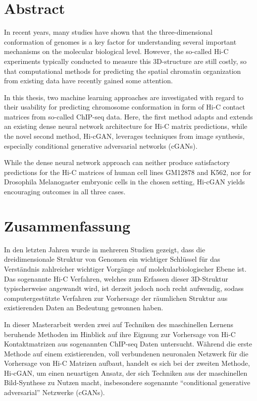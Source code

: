 %
\section*{Abstract}

In recent years, many studies have shown that the three-dimensional conformation of genomes is a key factor
for understanding several important mechanisms on the molecular biological level.
However, the so-called Hi-C experiments typically conducted to measure this 3D-structure are still costly,
so that computational methods for predicting the spatial chromatin organization from existing data have recently gained some attention. 

In this thesis, two machine learning approaches are investigated with 
regard to their usability for predicting chromosome conformation in form of Hi-C contact matrices from so-called ChIP-seq data.
Here, the first method adapts and extends an existing dense neural network architecture for Hi-C matrix predictions, 
while the novel second method, Hi-cGAN, leverages techniques from image synthesis, especially conditional generative adversarial networks (cGANs).

While the dense neural network approach can neither produce satisfactory predictions for the Hi\hbox{-}C matrices of human cell lines GM12878 and K562,
nor for Drosophila Melanogaster embryonic cells in the chosen setting, Hi-cGAN yields encouraging outcomes in all three cases.


\section*{Zusammenfassung}

In den letzten Jahren wurde in mehreren Studien gezeigt, dass die dreidimensionale Struktur von Genomen ein
wichtiger Schlüssel für das Verständnis zahlreicher wichtiger Vorgänge auf molekularbiologischer Ebene ist.
Das sogenannte Hi-C Verfahren, welches zum Erfassen dieser 3D-Struktur typischerweise angewandt wird,
ist derzeit jedoch noch recht aufwendig, sodass computergestützte Verfahren zur Vorhersage 
der räumlichen Struktur aus existierenden Daten an Bedeutung gewonnen haben.

In dieser Masterarbeit werden zwei auf Techniken des maschinellen Lernens beruhende Methoden im Hinblick auf ihre Eignung  
zur Vorhersage von Hi-C Kontaktmatrizen aus sogenannten ChIP-seq Daten untersucht.
Während die erste Methode auf einem existierenden, voll verbundenen neuronalen Netzwerk für die Vorhersage von Hi-C Matrizen aufbaut,
handelt es sich bei der zweiten Methode, Hi-cGAN, um einen neuartigen Ansatz, der sich Techniken aus der maschinellen Bild-Synthese zu Nutzen macht,
insbesondere sogenannte ``conditional generative adversarial'' Netzwerke (cGANs).

